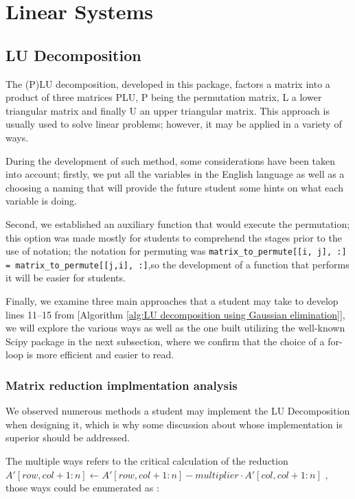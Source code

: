 \section{Linear Systems}
\subsection{LU Decomposition}
The (P)LU decomposition, developed in this package, factors a matrix into a product of three matrices PLU, P being the permutation matrix, L a lower triangular matrix and finally U an upper triangular matrix. This approach is usually used to solve linear problems; however, it may be applied in a variety of ways.

During the development of such method, some considerations have been taken into account; firstly, we put all the variables in the English language as well as a choosing a naming that will provide the future student some hints on what each variable is doing. 

Second, we established an auxiliary function that would execute the permutation; this option was made mostly for students to comprehend the stages prior to the use of notation; the notation for permuting was \lstinline|matrix_to_permute[[i, j], :] = matrix_to_permute[[j,i], :]|,so the development of a function that performs it will be easier for students.

Finally, we examine three main approaches that a student may take to develop lines 11–15 from [Algorithm \ref{alg:LU decomposition using Gaussian elimination}], we will explore the various ways as well as the one built utilizing the well-known Scipy package in the next subsection, where we confirm that the choice of a for-loop is more efficient and easier to read.

\subsubsection{Matrix reduction implmentation analysis}
We observed numerous methods a student may implement the LU Decomposition when designing it, which is why some discussion about whose implementation is superior should be addressed.

The multiple ways refers to the critical calculation of the reduction $ A'[row, col+1:n] \gets A'[row, col+1:n] - multiplier \cdot A'[col, col+1:n] $ , those ways could be enumerated as :

